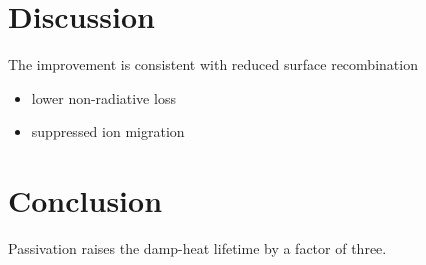 \documentclass[11pt,a4paper]{article}
\begin{document}
\section{Discussion}
\label{sec:discussions}
The improvement is consistent with reduced surface recombination
\begin{itemize}
\item lower non-radiative loss
\item suppressed ion migration
\end{itemize}

\section{Conclusion}
Passivation raises the damp-heat lifetime by a factor of three.



\end{document}
